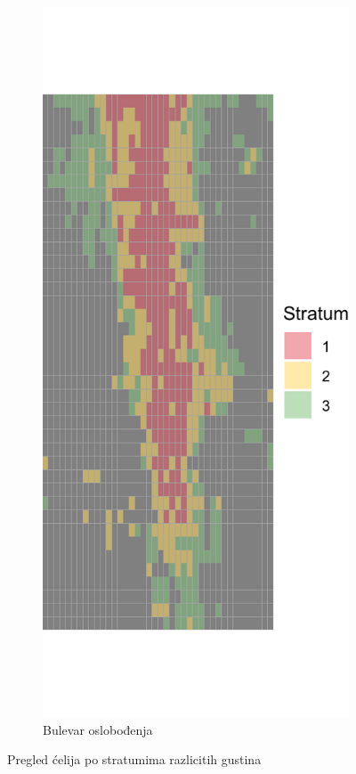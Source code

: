 \documentclass[a4paper,12pt]{article}
\begin{document}
\begin{figure}[H]
\begin{subfigure}[b]{0.3\textwidth}
	\end{subfigure}
	\hfill
	\begin{subfigure}[b]{0.3\textwidth}
	  \centering
	  \includegraphics[width=\textwidth]{../grid_output/strata_viz/bulevar-oslobodjenja_strata.png}
	  \caption{Bulevar oslobođenja}
	  \label{fig:bulevar-oslobodjenja}
	\end{subfigure}
  
	\caption{Pregled ćelija po stratumima razlicitih gustina}
\end{figure}
\end{document}
